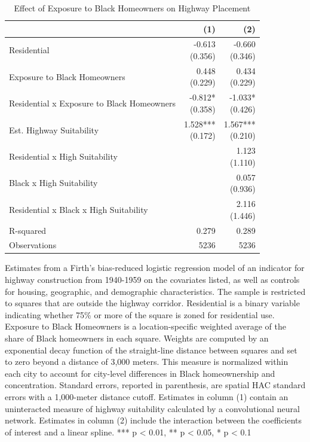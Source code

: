 \begin{table}[h]
\centering
\caption{Effect of Exposure to Black Homeowners on Highway Placement}
\label{tab:results/black_homeowners}
\begin{threeparttable}
\begin{tabular*}{0.8\textwidth}{@{\extracolsep{\fill}}l*{2}{r}}
\toprule
 & (1) & (2) \\
\midrule
Residential & \makecell[tr]{-0.613 \\ (0.356)} & \makecell[tr]{-0.660 \\ (0.346)} \\
Exposure to Black Homeowners & \makecell[tr]{0.448 \\ (0.229)} & \makecell[tr]{0.434 \\ (0.229)} \\
Residential x Exposure to Black Homeowners & \makecell[tr]{-0.812{*} \\ (0.358)} & \makecell[tr]{-1.033{*} \\ (0.426)} \\
Est. Highway Suitability & \makecell[tr]{1.528{***} \\ (0.172)} & \makecell[tr]{1.567{***} \\ (0.210)} \\
Residential x High Suitability &  & \makecell[tr]{1.123 \\ (1.110)} \\
Black x High Suitability &  & \makecell[tr]{0.057 \\ (0.936)} \\
Residential x Black x High Suitability &  & \makecell[tr]{2.116 \\ (1.446)} \\
R-squared & 0.279 & 0.289 \\
Observations & 5236 & 5236 \\
\bottomrule
\end{tabular*}
\begin{tablenotes}[flushleft]
\footnotesize
\item Estimates from a Firth's bias-reduced logistic regression model of an indicator for highway construction from 1940-1959 on the covariates listed, as well as controls for housing, geographic, and demographic characteristics. The sample is restricted to squares that are outside the highway corridor. Residential is a binary variable indicating whether 75\% or more of the square is zoned for residential use. Exposure to Black Homeowners is a location-specific weighted average of the share of Black homeowners in each square. Weights are computed by an exponential decay function of the straight-line distance between squares and set to zero beyond a distance of 3,000 meters. This measure is normalized within each city to account for city-level differences in Black homeownership and concentration. Standard errors, reported in parenthesis, are \textcite{conley_gmm_1999} spatial HAC standard errors with a 1,000-meter distance cutoff. Estimates in column (1) contain an uninteracted measure of highway suitability calculated by a convolutional neural network. Estimates in column (2) include the interaction between the coefficients of interest and a linear spline. *** p < 0.01, ** p < 0.05, * p < 0.1

\end{tablenotes}
\end{threeparttable}
\end{table}
